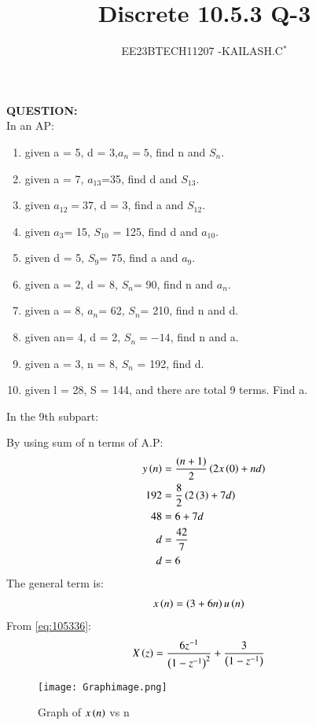\documentclass[journal,12pt,twocolumn]{IEEEtran}
\theoremstyle{remark}
\begin{document}

\vspace{3cm}

\title{Discrete 10.5.3 Q-3}
\author{EE23BTECH11207 -KAILASH.C$^{*}$%
}
\maketitle
\newpage
\bigskip

\renewcommand{\thefigure}{\theenumi}
\renewcommand{\thetable}{\theenumi}

\textbf{QUESTION:}\\
In an AP:
\begin{enumerate}
\item given a = 5, d = 3,$a_n=5$, find n and $S_n$.
\item given a = 7, $a_{13}$=35, find d and $S_{13}$.
\item given $a_{12}=37$, d = 3, find a and $S_{12}$.
\item given $a_3$= 15, $S_{10}$ = 125, find d and $a_{10}$.
\item given d = 5, $S_9$= 75, find a and $a_9$.
\item given a = 2, d = 8, $S_n$= 90, find n and $a_n$.
\item given a = 8, $a_n$= 62, $S_n$= 210, find n and d.
\item given an= 4, d = 2, $S_n=-14$, find n and a.
\item given a = 3, n = 8, $S_n$ = 192, find d.
\item given l = 28, S = 144, and there are total 9 terms. Find a.
\end{enumerate}
\solution 
In the 9th subpart:

By using sum of n terms of A.P:
\begin{align}
y\left(n\right)&=\frac{\left(n+1\right)}{2}\left(2x\left(0\right)+nd\right)\label{eq:105331}\\
 192&=\frac{8}{2}\left(2\left(3\right)+7d\right)\label{eq:105332}\\
 48&=6+7d\label{eq:105533}\\
 d&=\frac{42}{7}\label{eq:105334}\\
 d&=6\label{eq:105335}
\end{align}
The general term is:
\begin{align}
    x\left(n\right)&=\left(3+6n\right)u\left(n\right)\label{eq:105336}
\end{align}
From \eqref{eq:105336}:
\begin{align}
    X\left(z\right)&=\frac{6z^{-1}}{\left(1-z^{-1}\right)^2}+\frac{3}{\left(1-z^{-1}\right)}\label{eq:105337}
\end{align}
\begin{figure}[h]
        \centering
\texttt{[image: Graphimage.png]}
\caption{Graph of $x\left(n\right)$ vs n}
\label{fig:Fig10_5_3_3}
\end{figure}
\end{document}
